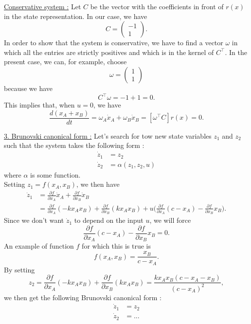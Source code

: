 \underline{Conservative system :}
Let $C$ be the vector with the coefficients in front of $r(x)$ in the state representation. In our case, we have 
$$C = \begin{pmatrix}
-1\\
1
\end{pmatrix}.$$
In order to show that the system is conservative, we have to find a vector $\omega$ in which all the entries are strictly positives and which is in the kernel of $C^{\top}$. In the present case, we can, for example, choose
$$\omega = \begin{pmatrix}
1\\
1
\end{pmatrix}$$ because we have $$C^{\top}\omega = -1+1 = 0.$$
This implies that, when $u = 0$, we have $$\frac{d(x_A+x_B)}{dt} = \omega_A \dot{x}_A + \omega_B \dot{x}_B = [\omega^{\top}C]r(x) = 0.$$

\underline{3. Brunovski canonical form :}
Let's search for tow new state variables $z_1$ and $z_2$ such that the system takes the following form :
\begin{align*}
\dot{z}_1 & = z_2\\
\dot{z}_2 & = \alpha(z_1,z_2,u)
\end{align*}
where $\alpha$ is some function.\\
Setting $z_1 = f(x_A,x_B)$, we then have 
\begin{align*}
\dot{z}_1 & = \frac{\partial f}{\partial x_A}\dot{x}_A + \frac{\partial f}{\partial x_B}\dot{x}_B\\
 & = \frac{\partial f}{\partial x_A}(-kx_Ax_B) + \frac{\partial f}{\partial x_B}(kx_Ax_B) + u\Big(\frac{\partial f}{\partial x_A}(c-x_A)-\frac{\partial f}{\partial x_B}x_B\Big).
\end{align*}
Since we don't want $\dot{z}_1$ to depend on the input $u$, we will force $$\frac{\partial f}{\partial x_A}(c-x_A)-\frac{\partial f}{\partial x_B}x_B = 0.$$
An example of function $f$ for which this is true is $$f(x_A,x_B) = \frac{x_B}{c-x_A}.$$
By setting $$z_2 = \frac{\partial f}{\partial x_A}(-kx_Ax_B) + \frac{\partial f}{\partial x_B}(kx_Ax_B) = \frac{kx_Ax_B(c-x_A-x_B)}{(c-x_A)^2},$$ we then get the following Brunovski canonical form :
\begin{align*}
\dot{z}_1 & = z_2\\
\dot{z}_2 & = ...
\end{align*}

